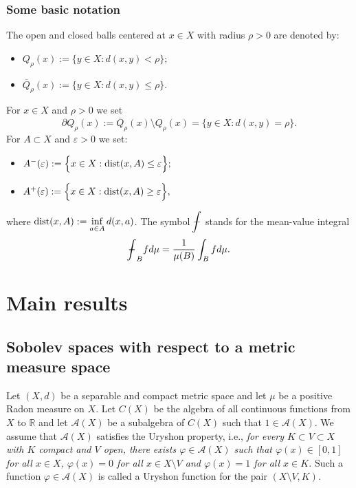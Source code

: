 \documentclass[10pt]{amsart}
\numberwithin{equation}{section}
\theoremstyle{definition}
\theoremstyle{remark}
\begin{document}
\subsubsection*{Some basic notation} The open and closed balls centered at $x\in X$ with radius $\rho>0$ are denoted by:
\begin{itemize}
\item $Q_\rho(x):=\Big\{y\in X:d(x,y)<\rho\Big\};$
\item $\overline{Q}_\rho(x):=\Big\{y\in X:d(x,y)\leq\rho\Big\}.$
\end{itemize}
For $x\in X$ and $\rho>0$ we set 
$$
\partial Q_\rho(x):=\overline{Q}_\rho(x)\setminus Q_\rho(x)=\Big\{y\in X:d(x,y)=\rho\Big\}.
$$
For $A\subset X$ and ${\varepsilon}>0$ we set:
\begin{itemize}
\item $A^-({\varepsilon}):=\Big\{x\in X:{\rm dist}(x,A)\leq{\varepsilon}\Big\};$
\item $A^+({\varepsilon}):=\Big\{x\in X:{\rm dist}(x,A)\geq{\varepsilon}\Big\},$
\end{itemize}
where ${\rm dist}(x,A):=\inf\limits_{a\in A}d(x,a)$. The symbol $\displaystyle {{{\bf-}\!\!\!\!\!\!\hspace{-.1em}\int}}$ stands for the mean-value integral 
$$
{{{\bf-}\!\!\!\!\!\!\hspace{-.1em}\int}}_Bf d\mu={1\over\mu(B)}\int_Bf d\mu.
$$
 
\section{Main results} 

\subsection{Sobolev spaces with respect to a metric measure space} Let $(X,d)$ be a separable and compact metric space and let $\mu$ be a positive Radon measure on $X$. Let $C(X)$ be the algebra of all continuous functions from $X$ to ${{\mathbb R}}$ and let $\mathcal{A}(X)$ be a subalgebra of $C(X)$ such that $1\in\mathcal{A}(X)$. We assume that $\mathcal{A}(X)$ satisfies the Uryshon property, i.e., {\em for every $K\subset V\subset X$ with $K$ compact and $V$ open, there exists $\varphi\in\mathcal{A}(X)$ such that $\varphi(x)\in[0,1]$ for all $x\in X$, $\varphi(x)=0$ for all $x\in X\setminus V$ and $\varphi(x)=1$ for all $x\in K$.} Such a function $\varphi\in\mathcal{A}(X)$ is called a Uryshon function for the pair $(X\setminus V,K)$.
\end{document}
